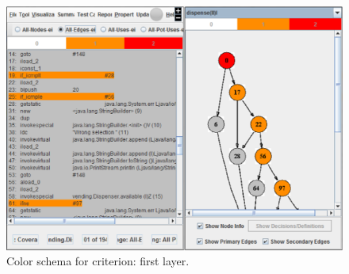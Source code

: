 
\begin{figure}[!ht]
\begin{center}
\includegraphics[height=0.40\textheight]{fig/decision-layer1.eps}
\caption{\label{fig:decision-color} Color schema for
 criterion: first layer.}
\end{center}
\end{figure}
